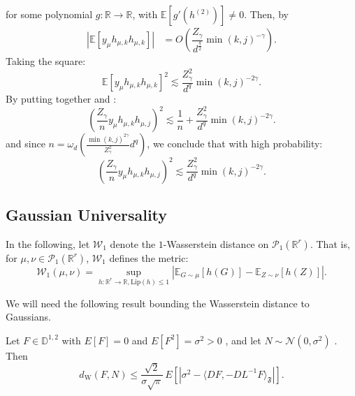 \documentclass[]{article}
\makeatletter
\numberwithin{equation}{section}
\theoremstyle{definition}
\renewenvironment{proof}[1][\proofname]{\par
  \pushQED{\qed}%
  \normalfont \topsep6\p@\@plus6\p@\relax
  \trivlist
  \item[\hskip\labelsep\textbf{#1.}]\ignorespaces
}{%
  \popQED\endtrivlist\@endpefalse
}
\newcommand{\RR}{\mathbb{R}}
\newcommand{\EE}{\mathbb{E}}
\makeatother
\begin{document}
\begin{proof}
    for some polynomial $g:\RR \to \RR$, with $\EE[g'(h^{(2)})] \not = 0$. Then, by 
    \begin{align}
         \left | \EE \left [ y_\mu h_{\mu,k}h_{\mu,k} \right ] \right | &= O \left ( \dfrac{Z_\gamma }{d^{\frac{q}{2}}} \min(k,j)^{-\gamma} \right ). 
    \end{align}
    Taking the square:
    \begin{equation}
        \EE \left [ y_\mu h_{\mu,k}h_{\mu,k} \right ]^{2} \lesssim \dfrac{Z_\gamma ^2}{d^{q}} \min(k,j)^{-2\gamma}. 
        \label{eq:bound_II_sum_y}
    \end{equation}
    By putting together  and : 
    \begin{equation}
         \left ( \dfrac{Z_\gamma }{n} y_\mu h_{\mu,k} h_{\mu,j} \right )^{2} \lesssim \dfrac{1}{n} + \dfrac{Z_\gamma ^2}{d^{q}} \min(k,j)^{-2\gamma}.
    \end{equation}
    and since $n = \omega_{d}(\frac{\min(k,j)^{2\gamma}}{Z_\gamma ^{2}}d^{q} )$,  we conclude that with high probability: 
    \begin{equation}
        \left ( \dfrac{Z_\gamma }{n} y_\mu h_{\mu,k} h_{\mu,j} \right )^{2} \lesssim \dfrac{Z_\gamma ^2}{d^{q}} \min(k,j)^{-2\gamma}. 
    \end{equation}
\end{proof}

\subsection{Gaussian Universality}

In the following, let $\mathcal{W}_{1}$ denote the $1$-Wasserstein distance on $\mathcal{P}_{1}(\RR^{r})$. That is,  for $\mu, \nu \in \mathcal{P}_{1}(\RR^{r})$, $\mathcal{W}_{1}$ defines the metric: 
\begin{equation}
    \mathcal{W}_{1}(\mu, \nu ) = \sup_{h: \RR^{r} \to \RR, \mathrm{Lip}(h) \leq 1} \left | \EE_{G \sim \mu} [h(G)] - \EE_{Z \sim \nu} [h(Z)]\right |. 
\end{equation}

We will need the following result bounding the Wasserstein distance to Gaussians. 
\begin{lemma} Let $F \in \mathbb{D}^{1,2}$ with $E[F] = 0$ and $E[F^2] = \sigma^2 > 0$ , and let $N \sim \mathcal{N}(0, \sigma^2)$ . Then
$$
d_{\mathrm{W}}(F, N) \leq \frac{\sqrt{2}}{\sigma \sqrt{\pi}} \, E\left[\left|\sigma^2 - \langle DF, -DL^{-1}F \rangle_{\mathfrak{F}}\right|\right]. 
$$
\label{lemma:one_dimensional_CLT}
\end{lemma}
\end{document}
